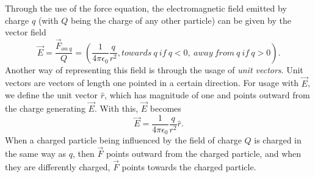 \documentclass[12pt,letterpaper]{article}
\newcommand{\rhat}{\hat{r}}
\begin{document}
Through the use of the force equation, the electromagnetic field emitted by charge $q$ (with $Q$ being the charge of any other particle) can be given by the vector field $$\vec{E} = \frac{\vec{F}_{on\ q}}{Q} = \left(\frac{1}{4\pi\epsilon_{0}}\frac{q}{r^{2}}, towards\ q\ if\ q < 0,\ away\ from\ q\ if\ q > 0\right).$$ Another way of representing this field is through the usage of \textit{unit vectors}. Unit vectors are vectors of length one pointed in a certain direction. For usage with $\vec{E}$, we define the unit vector $\rhat$, which has magnitude of one and points outward from the charge generating $\vec{E}$. With this, $\vec{E}$ becomes $$\vec{E} = \frac{1}{4\pi\epsilon_{0}}\frac{q}{r^{2}} \rhat.$$ When a charged particle being influenced by the field of charge $Q$ is charged in the same way as $q$, then $\vec{F}$ points outward from the charged particle, and when they are differently charged, $\vec{F}$ points towards the charged particle.
\end{document}
